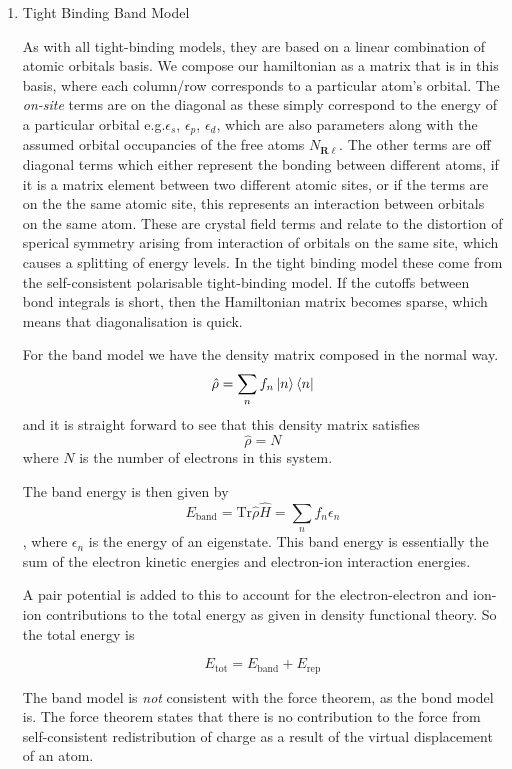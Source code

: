 \documentclass[11pt]{article}
\begin{document}
\begin{enumerate}
\item Tight Binding Band Model
\label{sec:orgcbe6b80}

As with all tight-binding models, they are based on a linear combination of atomic orbitals basis. 
We compose our hamiltonian as a matrix that is in this basis, where each column/row corresponds to a particular
atom's orbital.
The \emph{on-site} terms are on the diagonal as these simply correspond to the energy of a particular orbital
e.g.\(\epsilon_s\), \(\epsilon_p\), \(\epsilon_d\), which are also parameters along with the assumed orbital occupancies 
of the free atoms \(N_{\mathbf{R}\ell}\).
The other terms are off diagonal terms which either represent the bonding between different atoms, if it is a matrix element
between two different atomic sites, or if the terms are on the the same atomic site, this represents an interaction
between orbitals on the same atom. These are crystal field terms and relate to the distortion of sperical symmetry arising from
interaction of orbitals on the same site, which causes a splitting of energy levels. 
In the tight binding model these come from the self-consistent polarisable tight-binding 
model. If the cutoffs between bond integrals is short, then the Hamiltonian matrix becomes sparse, 
which means that diagonalisation is quick. 

For the band model we have the density matrix composed in the normal way. 
$$ \hat{\rho} = \sum_{n} f_{n} \ket{n} \bra{n}$$ and it is straight forward to see that this density matrix satisfies 
$$ \hat{\rho} = N $$ where \(N\) is the number of electrons in this system. 

The band energy is then given by $$E_{\text{band}} = \text{Tr}\hat{\rho}\hat{H} = \sum_{n} f_{n}\epsilon_{n} $$, where \(\epsilon_{n}\)
is the energy of an eigenstate. This band energy is essentially the sum of the electron kinetic energies and electron-ion interaction energies. 

A pair potential is added to this to account for the electron-electron and ion-ion contributions to the total energy 
as given in density functional theory.
So the total energy is 

$$ E_{\text{tot}} =   E_{\text{band}} + E_{\text{rep}} $$


The band model is \emph{not} consistent with the force theorem, as the bond model is.
The force theorem states that there is no contribution to the force from self-consistent redistribution of charge 
as a result of the virtual displacement of an atom. 


\end{enumerate}
\end{document}
